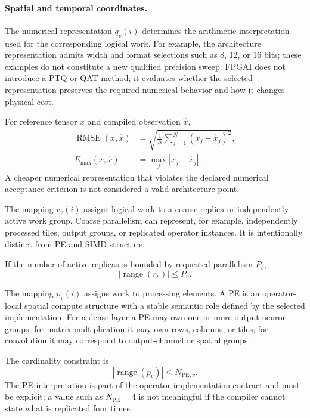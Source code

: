 \documentclass{article}
\begin{document}
\paragraph{Spatial and temporal coordinates.}
\label{sec:spacetime}


The numerical representation $q_v(i)$ determines the arithmetic interpretation used for the corresponding logical work. For example, the architecture representation admits width and format selections such as 8, 12, or 16 bits; these examples do not constitute a new qualified precision sweep. FPGAI does not introduce a PTQ or QAT method; it evaluates whether the selected representation preserves the required numerical behavior and how it changes physical cost.

For reference tensor $x$ and compiled observation $\hat{x}$,
\begin{align}
\operatorname{RMSE}(x,\hat{x})
&=
\sqrt{\frac{1}{N}\sum_{j=1}^{N}(x_j-\hat{x}_j)^2},\\
E_{\max}(x,\hat{x})
&=
\max_j |x_j-\hat{x}_j|.
\end{align}
A cheaper numerical representation that violates the declared numerical acceptance criterion is not considered a valid architecture point.


The mapping $r_v(i)$ assigns logical work to a coarse replica or independently active work group. Coarse parallelism can represent, for example, independently processed tiles, output groups, or replicated operator instances. It is intentionally distinct from PE and SIMD structure.

If the number of active replicas is bounded by requested parallelism $P_v$,
\begin{equation}
|\operatorname{range}(r_v)|\le P_v.
\label{eq:coarse-par}
\end{equation}


The mapping $p_v(i)$ assigns work to processing elements. A PE is an operator-local spatial compute structure with a stable semantic role defined by the selected implementation. For a dense layer a PE may own one or more output-neuron groups; for matrix multiplication it may own rows, columns, or tiles; for convolution it may correspond to output-channel or spatial groups.

The cardinality constraint is
\begin{equation}
|\operatorname{range}(p_v)|\le N_{\mathrm{PE},v}.
\label{eq:pe-cardinality}
\end{equation}
The PE interpretation is part of the operator implementation contract and must be explicit; a value such as $N_{\mathrm{PE}}=4$ is not meaningful if the compiler cannot state what is replicated four times.
\end{document}
